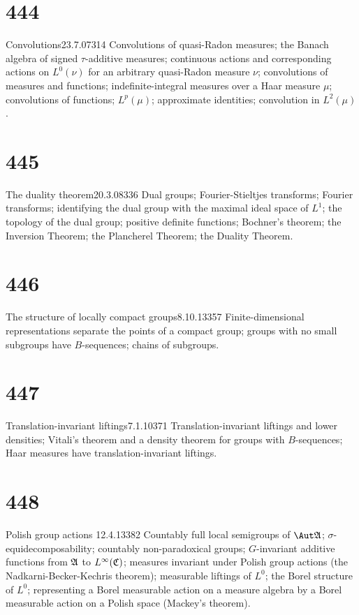 \section{444}{Convolutions}{23.7.07}{314}{}
{Convolutions of quasi-Radon measures;  the Banach algebra of
signed $\tau$-additive measures;  continuous actions and corresponding
actions on $L^0(\nu)$
for an arbitrary quasi-Radon measure $\nu$;  convolutions of measures
and functions;  indefinite-integral measures over a Haar measure $\mu$;
convolutions of functions;  $L^p(\mu)$;  approximate identities;
convolution in $L^2(\mu)$.}

\section{445}{The duality theorem}{20.3.08}{336}{}
{Dual groups;  Fourier-Stieltjes transforms;  Fourier transforms;
identifying the dual group with the maximal ideal space of $L^1$;  the
topology of the dual group;  positive definite functions;  Bochner's
theorem;  the Inversion Theorem;  the Plancherel Theorem;  the Duality
Theorem.}

\section{446}{The structure of locally compact groups}{8.10.13}{357}{}
{Finite-dimensional representations separate the points of a
compact group;  groups with no small subgroups have $B$-sequences;
chains of subgroups.}

\ifdim\pagewidth>467pt\fontdimen3\tenrm=2pt\fi

\section{447}{Translation-invariant liftings}{7.1.10}{371}{}
{Translation-invariant liftings and lower densities;
Vitali's theorem and a
density theorem for groups with $B$-sequences;   Haar measures have
transla\discretionary{}{-}{}tion-{\vthsp}invariant liftings.}

\tenrm=1.67pt

\section{448}{Polish group actions}
{12.4.13}{382}{}
{Countably full local semigroups of $\Aut\frak{A}$;
$\sigma$-equidecomposability;   countably non-paradoxical groups;
$G$-invariant additive functions from $\frak{A}$ to
$L^{\infty}(\frak{C})$;  measures invariant under Polish group actions
(the Nadkarni-Becker-Kechris theorem);  measurable liftings of $L^0$;
the Borel structure of $L^0$;  representing a Borel measurable action on
a measure algebra by a Borel
measurable action on a Polish space (Mackey's theorem).}

